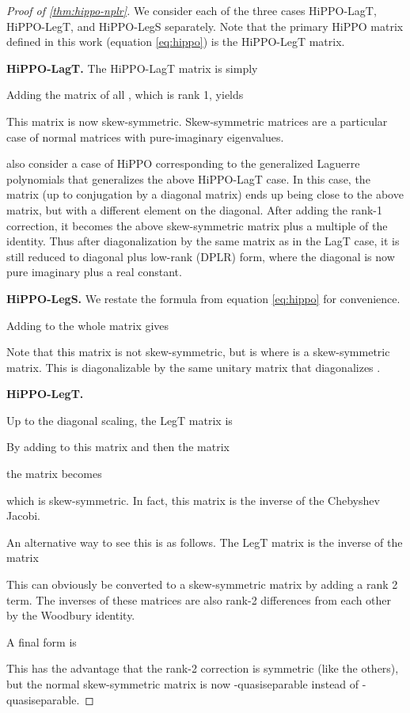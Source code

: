 \documentclass{article}
\begin{document}
\begin{proof}[Proof of \cref{thm:hippo-nplr}]We consider each of the three cases HiPPO-LagT, HiPPO-LegT, and HiPPO-LegS separately.
  Note that the primary HiPPO matrix defined in this work (equation \eqref{eq:hippo}) is the HiPPO-LegT matrix.

  \textbf{HiPPO-LagT.}
  The HiPPO-LagT matrix is simply
  
  Adding the matrix of all , which is rank 1, yields
  
  This matrix is now skew-symmetric.
  Skew-symmetric matrices are a particular case of normal matrices
  with pure-imaginary eigenvalues.

  \citet{gu2020hippo} also consider a case of HiPPO corresponding to the generalized Laguerre polynomials that generalizes
  the above HiPPO-LagT case.
  In this case, the matrix  (up to conjugation by a diagonal matrix) ends up being close to the above matrix,
  but with a different element on the diagonal.
  After adding the rank-1 correction, it becomes the above skew-symmetric matrix plus a multiple of the identity.
  Thus after diagonalization by the same matrix as in the LagT case, it is still reduced to diagonal plus low-rank (DPLR) form,
  where the diagonal is now pure imaginary plus a real constant.

  \textbf{HiPPO-LegS.}
  We restate the formula from equation \eqref{eq:hippo} for convenience.
  
  Adding  to the whole matrix gives
  

  Note that this matrix is not skew-symmetric,
  but is  where  is a skew-symmetric matrix.
  This is diagonalizable by the same unitary matrix that diagonalizes .

  \textbf{HiPPO-LegT.}

  Up to the diagonal scaling,
  the LegT matrix is
  
  By adding  to this matrix and then the matrix
  
  the matrix becomes
  
  which is skew-symmetric.
  In fact, this matrix is the inverse of the Chebyshev Jacobi.

  An alternative way to see this is as follows.
  The LegT matrix is the inverse of the matrix
  
  This can obviously be converted to a skew-symmetric matrix by adding a rank 2 term.
  The inverses of these matrices are also rank-2 differences from each other by the Woodbury identity.

  A final form is
  
  This has the advantage that the rank-2 correction is symmetric (like the others),
  but the normal skew-symmetric matrix is now -quasiseparable instead of -quasiseparable.

\end{proof}
\end{document}
